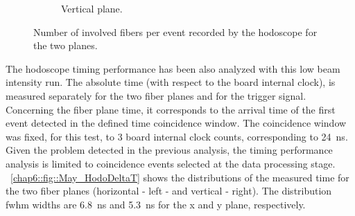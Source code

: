 \begin{figure}
\begin{subfigure}[t]{.5\textwidth}
\caption{Vertical plane.}
\label{chap6::fig::May_HodoClusY}
\end{subfigure}
\caption{Number of involved fibers per event recorded by the hodoscope for the two planes.}
\label{chap6::fig::May_HodoClusters}
\end{figure}

The hodoscope timing performance has been also analyzed with this low beam intensity run. The absolute time (with respect to the board internal clock), is measured separately for the two fiber planes and for the trigger signal. Concerning the fiber plane time, it corresponds to the arrival time of the first event detected in the defined time coincidence window. The coincidence window was fixed, for this test, to 3 board internal clock counts, corresponding to 24~ns. Given the problem detected in the previous analysis, the timing performance analysis is limited to coincidence events selected at the data processing stage.
\figurename~\ref{chap6::fig::May_HodoDeltaT} shows the distributions of the measured time for the two fiber planes (horizontal - left - and vertical - right). The distribution \gls{fwhm} widths are 6.8~ns and 5.3~ns for the x and y plane, respectively. 

